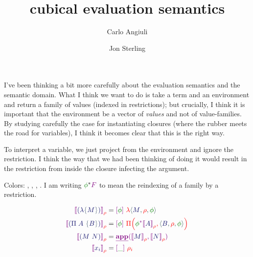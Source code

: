 \documentclass{article}
\title{cubical evaluation semantics}
\author{Carlo Angiuli \and Jon Sterling}
\newcommand\Eval[2]{
  \FmtFam{
    {\left\llbracket\FmtTm{#1}\right\rrbracket}_{\FmtVal{#2}}
  }
}
\begin{document}
\maketitle

I've been thinking a bit more carefully about the evaluation semantics and the
semantic domain. What I think we want to do is take a term and an environment
and return a family of values (indexed in restrictions); but crucially, I think
it is important that the environment be a vector of \emph{values} and not of
value-families. By studying carefully the case for instantiating closures
(where the rubber meets the road for variables), I think it becomes clear that
this is the right way.

To interpret a variable, we just project from the environment and ignore the
restriction. I think the way that we had been thinking of doing it would result
in the restriction from inside the closure infecting the argument.

\bigskip


Colors: , , ,
. I am writing $\Rst{\phi}{F}$ to mean the reindexing of a
family by a restriction.

\begin{align*}
  \Eval{
    \TLam{M}
  }{\rho}
  &=
  \Fam{\phi}{
    \VLam{
      \VClo{M}{\rho}{\phi}
    }
  }
  \\
  \Eval{
    \TPi{A}{B}
  }{\rho}
  &=
  \Fam{\phi}{
    \VPi{
      \Rst{\phi}{\Eval{A}{\rho}}
    }{
      \VClo{B}{\rho}{\phi}
    }
  }
  \\
  \Eval{
    \TApp{M}{N}
  }{\rho}
  &=
  \SemApp{
    \Eval{M}{\rho}
  }{
    \Eval{N}{\rho}
  }
  \\
  \Eval{
    \TVar{i}
  }{\rho}
  &=
  \Fam{\_}{
    \rho_i
  }
\end{align*}
\end{document}
